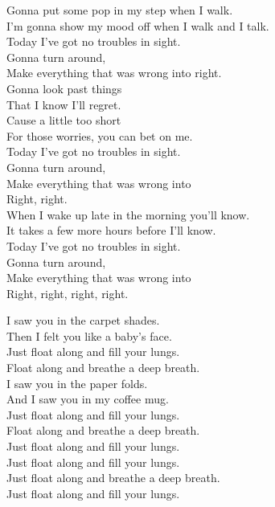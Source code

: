 Gonna put some pop in my step when I walk. \\
I'm gonna show my mood off when I walk and I talk. \\
Today I've got no troubles in sight. \\
Gonna turn around, \\
Make everything that was wrong into right. \\

Gonna look past things \\
That I know I'll regret. \\
Cause  a little too short \\
For those worries, you can bet on me. \\
Today I've got no troubles in sight. \\
Gonna turn around, \\
Make everything that was wrong into \\
Right, right. \\

When I wake up late in the morning you'll know. \\
It takes a few more hours before I'll know. \\
Today I've got no troubles in sight. \\
Gonna turn around, \\
Make everything that was wrong into \\
Right, right, right, right. \\





I saw you in the carpet shades. \\
Then I felt you like a baby's face. \\
Just float along and fill your lungs. \\
Float along and breathe a deep breath. \\

I saw you in the paper folds. \\
And I saw you in my coffee mug. \\
Just float along and fill your lungs. \\
Float along and breathe a deep breath. \\

Just float along and fill your lungs. \\
Just float along and fill your lungs. \\
Just float along and breathe a deep breath. \\
Just float along and fill your lungs. \\
